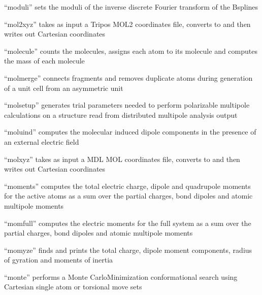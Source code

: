 \documentclass[letterpaper,11pt,english]{sphinxmanual}
\begin{document}

“moduli” sets the moduli of the inverse discrete Fourier
transform of the B\sphinxhyphen{}splines


“mol2xyz” takes as input a Tripos MOL2 coordinates file,
converts to and then writes out Cartesian coordinates


“molecule” counts the molecules, assigns each atom to
its molecule and computes the mass of each molecule


“molmerge” connects fragments and removes duplicate atoms
during generation of a unit cell from an asymmetric unit


“molsetup” generates trial parameters needed to perform
polarizable multipole calculations on a structure read
from distributed multipole analysis output


“moluind” computes the molecular induced dipole components
in the presence of an external electric field


“molxyz” takes as input a MDL MOL coordinates file,
converts to and then writes out Cartesian coordinates


“moments” computes the total electric charge, dipole and
quadrupole moments for the active atoms as a sum over the
partial charges, bond dipoles and atomic multipole moments


“momfull” computes the electric moments for the full system
as a sum over the partial charges, bond dipoles and atomic
multipole moments


“momyze” finds and prints the total charge, dipole moment
components, radius of gyration and moments of inertia


“monte” performs a Monte Carlo\sphinxhyphen{}Minimization conformational
search using Cartesian single atom or torsional move sets
\end{document}
